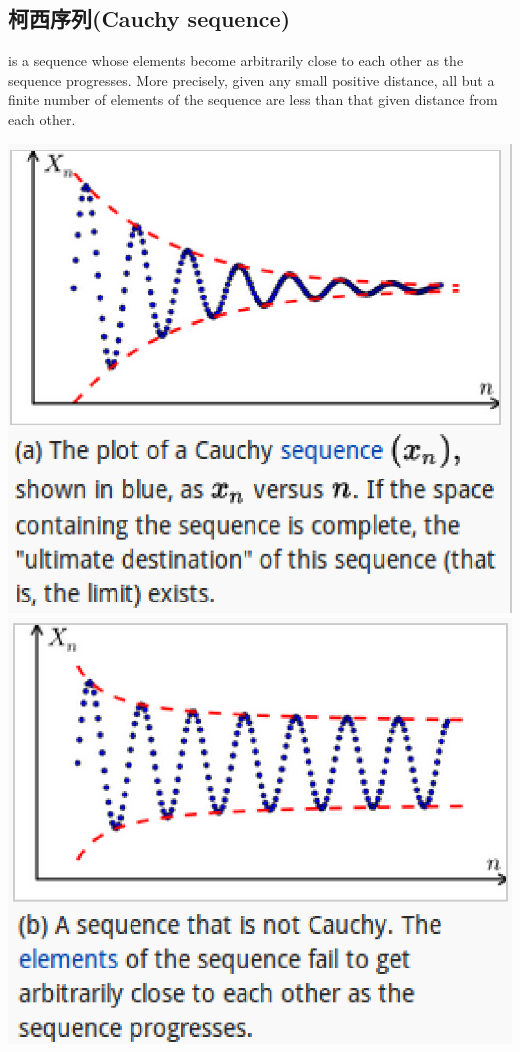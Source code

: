 \subsection{柯西序列(Cauchy sequence)}
\cite{_cauchy_????}
is a sequence whose elements become arbitrarily close to each other as the sequence progresses. More precisely, given any small positive distance, all but a finite number of elements of the sequence are less than that given distance from each other.\par
\includegraphics[scale=0.5]{fig/Cauchy_exam.eps}
\includegraphics[scale=0.5]{fig/Cauchy_not.eps}

